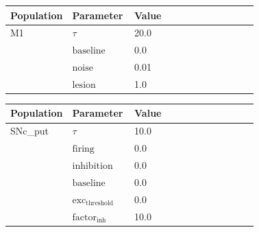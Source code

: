 \documentclass{article}
\begin{document}
\vspace{2ex}

\noindent
\begin{tabularx}{\linewidth}{|p{0.25\linewidth}|p{0.25\linewidth}|X|}\hline
\textbf{Population} & \textbf{Parameter} & \textbf{Value}   \\ \hline

    M1             & $\tau$        & 20.0  \\ \hline

                 & ${\text{baseline}}$        & 0.0  \\ \hline

                 & ${\text{noise}}$        & 0.01  \\ \hline

                 & ${\text{lesion}}$        & 1.0  \\ \hline

\end{tabularx}

\vspace{2ex}

\noindent
\begin{tabularx}{\linewidth}{|p{0.25\linewidth}|p{0.25\linewidth}|X|}\hline
\textbf{Population} & \textbf{Parameter} & \textbf{Value}   \\ \hline

    SNc\_put             & $\tau$        & 10.0  \\ \hline

                 & ${\text{firing}}$        & 0.0  \\ \hline

                 & ${\text{inhibition}}$        & 0.0  \\ \hline

                 & ${\text{baseline}}$        & 0.0  \\ \hline

                 & ${\text{exc}}_{\text{threshold}}$        & 0.0  \\ \hline

                 & ${\text{factor}}_{\text{inh}}$        & 10.0  \\ \hline

\end{tabularx}

\vspace{2ex}
\end{document}
